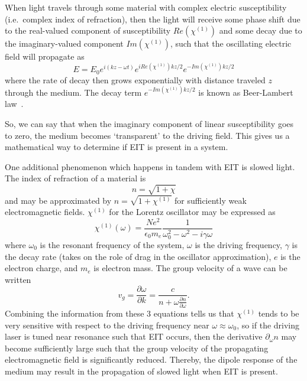 \documentclass[aps,pra,showpacs,amsmath,amssymb,nofootinbib,longbibliography,superscriptaddress
]{revtex4-1}
\theoremstyle{definition}
\theoremstyle{remark}
\newcommand{\0}{\hat{0}}
\begin{document}
When light travels through some material with complex electric susceptibility (i.e.~complex index of refraction), then the light will receive some phase shift due to the real-valued component of susceptibility $Re\left( \chi^{(1)} \right)$ and some decay due to the imaginary-valued component $Im\left( \chi^{(1)} \right)$, such that the oscillating electric field will propagate as
\begin{equation}\label{Beer}
    E = E_0 e^{i(k z - \omega t)}e^{iRe\left( \chi^{(1)} \right) k z / 2}e^{-Im\left( \chi^{(1)} \right) k z / 2}
\end{equation}
where the rate of decay then grows exponentially with distance traveled $z$ through the medium. The decay term $e^{-Im\left( \chi^{(1)} \right) k z / 2}$ is known as Beer-Lambert law~\cite{MacRae}.

So, we can say that when the imaginary component of linear susceptibility goes to zero, the medium becomes `transparent' to the driving field. This gives us a mathematical way to determine if EIT is present in a system.

One additional phenomenon which happens in tandem with EIT is slowed light. The index of refraction of a material is 
\begin{equation}
    n = \sqrt{1 + \chi}
\end{equation}
and may be approximated by $n = \sqrt{1 + \chi^{(1)}}$ for sufficiently weak electromagnetic fields. $\chi^{(1)}$ for the Lorentz oscillator may be expressed as~\cite{Peatross}
\begin{equation}
    \chi^{(1)}(\omega) = \frac{Ne^2}{\epsilon_0 m_e} \frac{1}{\omega_0^2 - \omega^2 - i \gamma \omega}
\end{equation}
where $\omega_0$ is the resonant frequency of the system, $\omega$ is the driving frequency, $\gamma$ is the decay rate (takes on the role of drag in the oscillator approximation), $e$ is the electron charge, and $m_e$ is electron mass. The group velocity of a wave can be written~\cite{GroupVelocity}
\begin{equation}
    v_g = \frac{\partial \omega}{\partial k} = \frac{c}{n + \omega \frac{\partial n}{\partial \omega}}.
\end{equation}
Combining the information from these 3 equations tells us that $\chi^{(1)}$ tends to be very sensitive with respect to the driving frequency near $\omega \approx \omega_0$, so if the driving laser is tuned near resonance such that EIT occurs, then the derivative $\partial_\omega n$ may become sufficiently large such that the group velocity of the propagating electromagnetic field is significantly reduced. Thereby, the dipole response of the medium may result in the propagation of slowed light when EIT is present. 
\end{document}
